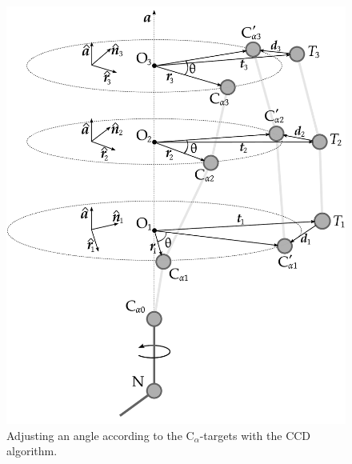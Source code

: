 \documentclass[a0,portrait]{a0poster}
\newcommand{\Ca}{C$_{\alpha}${}}
\begin{document}
\begin{GridBlock}{0}{72.3}{49}
\begin{multicols}{2}
\begin{figure}
  \centering
	\includegraphics[width=0.85\columnwidth]{../rapport/figures/ccd}
  \caption{Adjusting an angle according to the \Ca-targets with the CCD algorithm.}
  \label{fig:ccd}
\end{figure}
\end{multicols}
\end{GridBlock}
\end{document}
